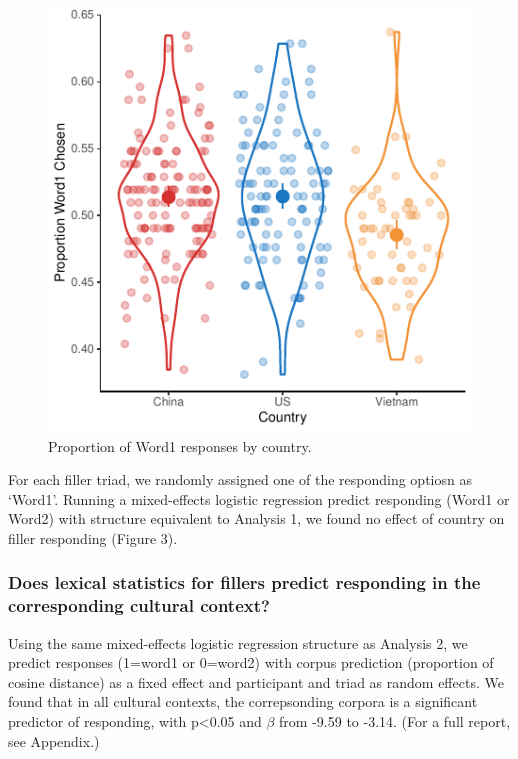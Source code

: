 \documentclass[10pt, letterpaper]{article}
\newenvironment{CodeChunk}{}{}
\begin{document}
\begin{CodeChunk}
\begin{figure}[tb]

{\centering \includegraphics{figs/unnamed-chunk-4-1} 

}

\caption[Proportion of Word1 responses by country]{Proportion of Word1 responses by country.}\label{fig:unnamed-chunk-4}
\end{figure}
\end{CodeChunk}

For each filler triad, we randomly assigned one of the responding
optiosn as `Word1'. Running a mixed-effects logistic regression predict
responding (Word1 or Word2) with structure equivalent to Analysis 1, we
found no effect of country on filler responding (Figure 3).

\hypertarget{does-lexical-statistics-for-fillers-predict-responding-in-the-corresponding-cultural-context}{%
\subsubsection{Does lexical statistics for fillers predict responding in
the corresponding cultural
context?}\label{does-lexical-statistics-for-fillers-predict-responding-in-the-corresponding-cultural-context}}

Using the same mixed-effects logistic regression structure as Analysis
2, we predict responses (1=word1 or 0=word2) with corpus prediction
(proportion of cosine distance) as a fixed effect and participant and
triad as random effects. We found that in all cultural contexts, the
correpsonding corpora is a significant predictor of responding, with
p\textless0.05 and \(\beta\) from -9.59 to -3.14. (For a full report,
see Appendix.)
\end{document}
